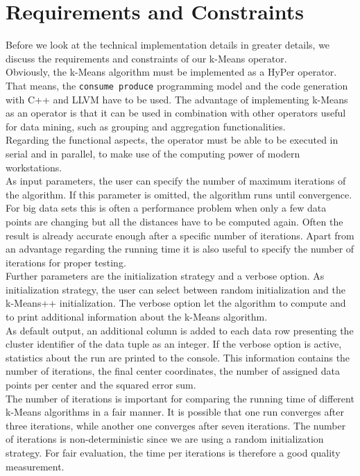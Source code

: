 \section{Requirements and Constraints}
Before we look at the technical implementation details in greater details, we discuss the requirements and constraints of our k-Means operator.
\\
Obviously, the k-Means algorithm must be implemented as a HyPer operator. That means, the \texttt{consume produce} programming model and the code generation with C++ and LLVM have to be used. The advantage of implementing k-Means as an operator is that it can be used in combination with other operators useful for data mining, such as grouping and aggregation functionalities.
\\
Regarding the functional aspects, the operator must be able to be executed in serial and in parallel, to make use of the computing power of modern workstations.
\\
As input parameters, the user can specify the number of maximum iterations of the algorithm. If this parameter is omitted, the algorithm runs until convergence. For big data sets this is often a performance problem when only a few data points are changing but all the distances have to be computed again. Often the result is already accurate enough after a specific number of iterations. Apart from an advantage regarding the running time it is also useful to specify the number of iterations for proper testing.
\\
Further parameters are the initialization strategy and a verbose option. As initialization strategy, the user can select between random initialization and the k-Means++ initialization. The verbose option let the algorithm to compute and to print additional information about the k-Means algorithm.
\\
As default output, an additional column is added to each data row presenting the cluster identifier of the data tuple as an integer. If the verbose option is active, statistics about the run are printed to the console. This information contains the number of iterations, the final center coordinates, the number of assigned data points per center and the squared error sum. 
\\
The number of iterations is  important for comparing the running time of different k-Means algorithms in a fair manner. It is possible that one run converges after three iterations, while another one converges after seven iterations. The number of iterations is non-deterministic since we are using a random initialization strategy. For fair evaluation, the time per iterations is therefore a good quality measurement.


